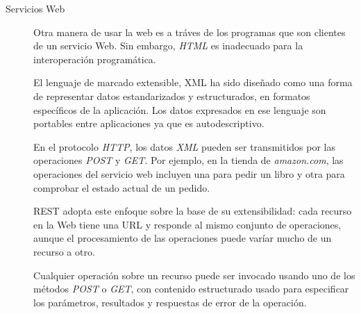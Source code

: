 \begin{description}
	\item[{Servicios Web}]  Otra manera de usar la web es a tr\'aves de los  programas que son clientes de un servicio Web. Sin embargo, \textit{HTML} es inadecuado para la interoperación programática.
	
	
	
	
	El lenguaje de marcado extensible, \gls{XML}  ha sido diseñado como una forma de representar datos estandarizados y estructurados,  en formatos espec\'ificos de la aplicaci\'on. Los datos expresados en  ese lenguaje son portables entre aplicaciones ya que es autodescriptivo.
	
	
	En el protocolo \textit{HTTP}, los datos \textit{XML} pueden ser transmitidos por las operaciones \textit{POST} y \textit{GET}.   Por ejemplo, en la tienda de \textit{amazon.com}, las operaciones del servicio web incluyen una para pedir un libro y otra para comprobar
	el estado actual de un pedido.
	
		\begin{kaobox}[frametitle=REST ]
			REST   \cite{Fielding2000} adopta este enfoque sobre la base de su extensibilidad: cada recurso en la Web tiene una URL y 	responde al mismo conjunto de operaciones, aunque el procesamiento de las operaciones puede varíar mucho de un recurso a otro.
		\end{kaobox}
	
	Cualquier operación sobre un recurso puede ser invocado usando uno de los métodos \textit{POST} o \textit{GET}, con contenido estructurado usado para especificar los parámetros, resultados y respuestas de error de la operación. 
	
\end{description}

